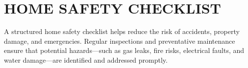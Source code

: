 
\section*{\centering HOME SAFETY CHECKLIST}
\vspace*{0.5cm}

A structured home safety checklist helps reduce the risk of accidents, property damage, and emergencies. Regular inspections and preventative maintenance ensure that potential hazards—such as gas leaks, fire risks, electrical faults, and water damage—are identified and addressed promptly.

